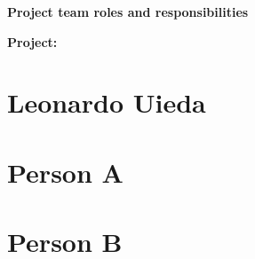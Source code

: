 \documentclass[onecolumn,a4paper,12pt]{article}
\newcommand{\DocumentTitle}{%
  Project team roles and responsibilities
}
\begin{document}
\begin{spacing}{2}
  \noindent
  {\LARGE \textbf{\DocumentTitle}}
\end{spacing}

\noindent
\textbf{Project:} \Title


\section*{Leonardo Uieda}


\lipsum[1]


\section*{Person A}


\lipsum[1]


\section*{Person B}


\lipsum[1]
\end{document}
